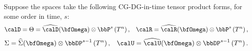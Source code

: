     \begin{example}
        Suppose the spaces take the following CG-DG-in-time tensor product forms, for some order in time, $s$:
        \begin{align}
            \calD  =  \Theta  =  \widehat{\calD}(\bfOmega)\otimes\bbP^{s}\left(T^{n}\right),  &&
                       \calR  =  \widehat{\calR}(\bfOmega)\otimes\bbP^{s}\left(T^{n}\right),
        \end{align}
        \vspace{- 10mm}
        \begin{align}
                      \Sigma  =  \widehat{\Sigma}(\bfOmega)\otimes\bbDP^{s - 1}\left(T^{n}\right),  &&
                       \calU  =  \widehat{\calU}(\bfOmega)\otimes\bbDP^{s - 1}\left(T^{n}\right).
        \end{align}


\end{example}
